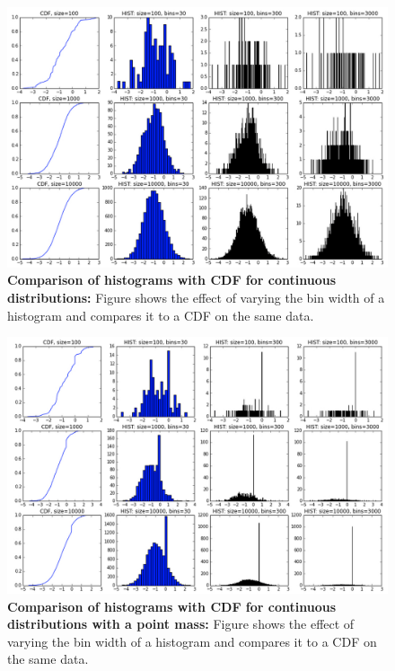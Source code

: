 \begin{figure}[th]
\begin{center}
\includegraphics[width=5in]{figs/HistogramsVsCDF_D.jpg}
\end{center}
\caption{{\bf Comparison of histograms with CDF for continuous distributions:} Figure shows the effect of varying the bin width of a histogram and compares it to a CDF on the same data.\label{fig:HistogramsVsCDF_D}}
\end{figure}

\begin{figure}[th]
\begin{center}
\includegraphics[width=5in]{figs/HistogramsVsCDF_PM+D.jpg}
\end{center}
\caption{{\bf Comparison of histograms with CDF for continuous distributions with a point mass:} Figure shows the effect of varying the bin width of a histogram and compares it to a CDF on the same data. \label{fig:HistogramsVsCDF_PM+D}}
\end{figure}

